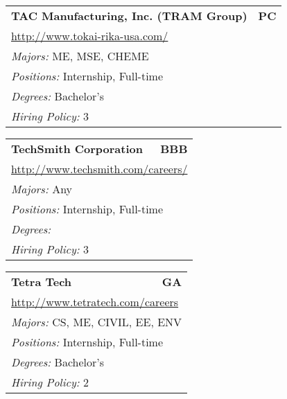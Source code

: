 \documentclass[twoside]{article}
\begin{document}
\begin{center}
\begin{multicols}{3}
\begin{FlushLeft}
\begin{minipage}{.9\columnwidth}
\end{minipage}
 
\begin{minipage}{.9\columnwidth}\begin{tabularx}{.95\columnwidth}{Xr}
                 {\Large\bf TAC Manufacturing, Inc. (TRAM Group)} & {\Large\bf PC}\\
    \multicolumn{2}{p{.95\columnwidth}}{\url{http://www.tokai-rika-usa.com/}}\\
    \multicolumn{2}{p{.95\columnwidth}}{\emph{Majors:} ME, MSE, CHEME}\\
    \multicolumn{2}{p{.95\columnwidth}}{\emph{Positions:} Internship, Full-time}\\
    \multicolumn{2}{p{.95\columnwidth}}{\emph{Degrees:} Bachelor's}\\
    \multicolumn{2}{p{.95\columnwidth}}{\emph{Hiring Policy:} 3}\\
    \end{tabularx}
    
\end{minipage}
 
\begin{minipage}{.9\columnwidth}\begin{tabularx}{.95\columnwidth}{Xr}
                 {\Large\bf TechSmith Corporation} & {\Large\bf BBB}\\
    \multicolumn{2}{p{.95\columnwidth}}{\url{http://www.techsmith.com/careers/}}\\
    \multicolumn{2}{p{.95\columnwidth}}{\emph{Majors:} Any}\\
    \multicolumn{2}{p{.95\columnwidth}}{\emph{Positions:} Internship, Full-time}\\
    \multicolumn{2}{p{.95\columnwidth}}{\emph{Degrees:} }\\
    \multicolumn{2}{p{.95\columnwidth}}{\emph{Hiring Policy:} 3}\\
    \end{tabularx}
    
\end{minipage}
 
\begin{minipage}{.9\columnwidth}\begin{tabularx}{.95\columnwidth}{Xr}
                 {\Large\bf Tetra Tech} & {\Large\bf GA}\\
    \multicolumn{2}{p{.95\columnwidth}}{\url{http://www.tetratech.com/careers}}\\
    \multicolumn{2}{p{.95\columnwidth}}{\emph{Majors:} CS, ME, CIVIL, EE, ENV}\\
    \multicolumn{2}{p{.95\columnwidth}}{\emph{Positions:} Internship, Full-time}\\
    \multicolumn{2}{p{.95\columnwidth}}{\emph{Degrees:} Bachelor's}\\
    \multicolumn{2}{p{.95\columnwidth}}{\emph{Hiring Policy:} 2}\\
    \end{tabularx}
    

\end{minipage}
\end{FlushLeft}
\end{multicols}
\end{center}
\end{document}
